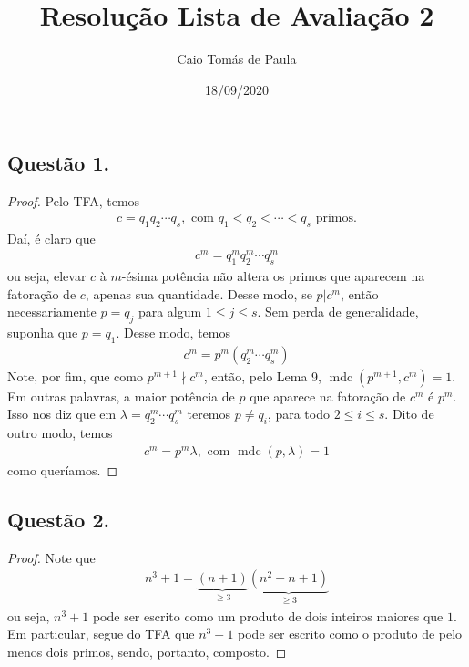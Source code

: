 \documentclass[a4paper,12pt]{article}
\title{Resolução Lista de Avaliação 2}
\date{18/09/2020}
\author{Caio Tomás de Paula}
\DeclareMathOperator{\mdc}{mdc}
\theoremstyle{definition}
\begin{document}
	\maketitle
	\subsection*{Questão 1.}
	\begin{proof}
	Pelo TFA, temos 
	\begin{align*}
	c = q_1q_2\cdots q_s, \text{ com } q_1 < q_2 < \cdots < q_s \text{ primos.}
	\end{align*}
	Daí, é claro que
	\begin{align*}
	c^m = q_1^mq_2^m\cdots q_s^m
	\end{align*}
	ou seja, elevar $c$ à $m$-ésima potência não altera os primos que aparecem na fatoração de $c$, apenas sua quantidade. Desse modo, se $p|c^m$, então necessariamente $p=q_j$ para algum $1\leq j\leq s$. Sem perda de generalidade, suponha que $p = q_1$. Desse modo, temos
	\begin{align*}
	c^m = p^m(q_2^m\cdots q_s^m)
	\end{align*}
	Note, por fim, que como $p^{m+1}\nmid c^m$, então, pelo Lema 9, $\mdc(p^{m+1}, c^m) = 1$. Em outras palavras, a maior potência de $p$ que aparece na fatoração de $c^m$ é $p^m$. Isso nos diz que em $\lambda = q_2^m\cdots q_s^m$ teremos $p\neq q_i$, para todo $2\leq i\leq s$. Dito de outro modo, temos
	\begin{align*}
	c^m = p^m\lambda, \text{ com } \mdc(p,\lambda) = 1
	\end{align*}
	como queríamos.
\end{proof}
\subsection*{Questão 2.}
\begin{proof}
	Note que
	\begin{align*}
	n^3 + 1 = \underbrace{(n+1)}_{\geq 3}\underbrace{(n^2 - n + 1)}_{\geq 3} 
	\end{align*}
	ou seja, $n^3 + 1$ pode ser escrito como um produto de dois inteiros maiores que $1$. Em particular, segue do TFA que $n^3 + 1$ pode ser escrito como o produto de pelo menos dois primos, sendo, portanto, composto.
\end{proof}
\end{document}
